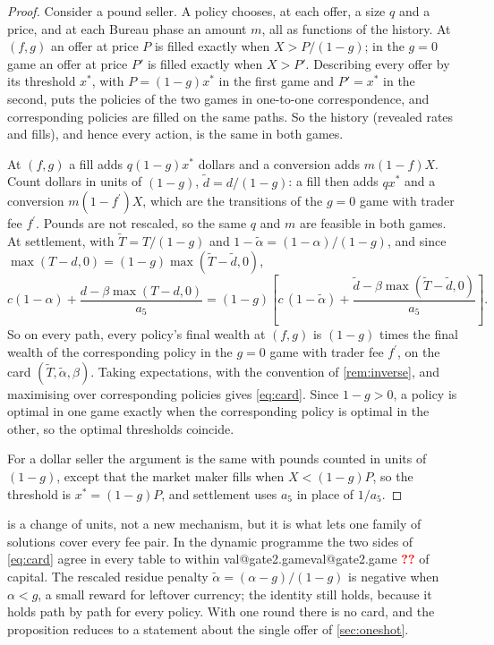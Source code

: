 \documentclass[11pt,a4paper]{article}
\makeatletter
\theoremstyle{plain}
\theoremstyle{definition}
\newcommand{\val}[1]{\ifcsname val@#1\endcsname\csname val@#1\endcsname\else
  \textcolor{red}{\textbf{??\detokenize{#1}}}\PackageWarning{paper}{Missing value #1}\fi}
\newcommand{\1}{\mathbf{1}}
\newcommand{\fp}{f^{\prime}}
\makeatother
\begin{document}
\begin{proof}
Consider a pound seller. A policy chooses, at each offer, a size $q$ and a price, and at each Bureau phase an amount $m$, all as functions of the history. At $(f,g)$ an offer at price $P$ is filled exactly when $X>P/(1-g)$; in the $g=0$ game an offer at price $P'$ is filled exactly when $X>P'$. Describing every offer by its threshold $x^*$, with $P=(1-g)x^*$ in the first game and $P'=x^*$ in the second, puts the policies of the two games in one-to-one correspondence, and corresponding policies are filled on the same paths. So the history (revealed rates and fills), and hence every action, is the same in both games.

At $(f,g)$ a fill adds $q(1-g)x^*$ dollars and a conversion adds $m(1-f)X$. Count dollars in units of $(1-g)$, $\tilde d=d/(1-g)$: a fill then adds $qx^*$ and a conversion $m(1-\fp)X$, which are the transitions of the $g=0$ game with trader fee $\fp$. Pounds are not rescaled, so the same $q$ and $m$ are feasible in both games. At settlement, with $\tilde T=T/(1-g)$ and $1-\tilde\alpha=(1-\alpha)/(1-g)$, and since $\max(T-d,0)=(1-g)\max(\tilde T-\tilde d,0)$,
\[
c(1-\alpha)+\frac{d-\beta\max(T-d,0)}{a_5} = (1-g)\left[c\,(1-\tilde\alpha)+\frac{\tilde d-\beta\max(\tilde T-\tilde d,0)}{a_5}\right].
\]
So on every path, every policy's final wealth at $(f,g)$ is $(1-g)$ times the final wealth of the corresponding policy in the $g=0$ game with trader fee $\fp$, on the card $(\tilde T,\tilde\alpha,\beta)$. Taking expectations, with the convention of \cref{rem:inverse}, and maximising over corresponding policies gives \eqref{eq:card}. Since $1-g>0$, a policy is optimal in one game exactly when the corresponding policy is optimal in the other, so the optimal thresholds coincide.

For a dollar seller the argument is the same with pounds counted in units of $(1-g)$, except that the market maker fills when $X<(1-g)P$, so the threshold is $x^*=(1-g)P$, and settlement uses $a_5$ in place of $1/a_5$.
\end{proof}

 is a change of units, not a new mechanism, but it is what lets one family of solutions cover every fee pair. In the dynamic programme the two sides of \eqref{eq:card} agree in every table to within \val{gate2.game} of capital. The rescaled residue penalty $\tilde\alpha=(\alpha-g)/(1-g)$ is negative when $\alpha<g$, a small reward for leftover currency; the identity still holds, because it holds path by path for every policy. With one round there is no card, and the proposition reduces to a statement about the single offer of \cref{sec:oneshot}.
\end{document}
